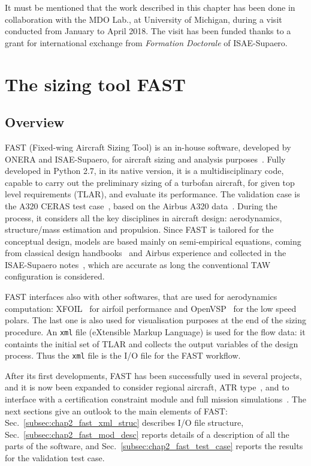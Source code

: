 It must be mentioned that the work described in this chapter has been done in collaboration with the MDO Lab., at University of Michigan, during a visit conducted from January to April 2018.
The visit has been funded thanks to a grant for international exchange from \textit{Formation Doctorale} of ISAE-Supaero. 

\section{The sizing tool FAST}
\label{sec:chap2_fast_base_description}

\subsection{Overview}
\label{subsec:chap2_fast_overview}
FAST (Fixed-wing Aircraft Sizing Tool) is an in-house software, developed by ONERA and ISAE-Supaero, for aircraft sizing and analysis purposes~\cite{bib:fast_main}. 
Fully developed in Python 2.7, in its native version, it is a multidisciplinary code, capable to carry out the preliminary sizing of a turbofan aircraft, for given top level requirements (TLAR), and evaluate its performance.
The validation case is the A320 CERAS test case~\cite{bib:schmollgruber}, based on the Airbus A320 data~\cite{bib:a320_specifications}. 
During the process, it considers all the key disciplines in aircraft design: aerodynamics, structure/mass estimation and propulsion. 
Since FAST is tailored for the conceptual design, models are based mainly on semi-empirical equations, coming from classical design handbooks~\cite{bib:roskam_partI, bib:raymer} and Airbus experience and collected in the ISAE-Supaero notes~\cite{bib:airbus_notes}, which are accurate as long the conventional TAW configuration is considered. 

FAST interfaces also with other softwares, that are used for aerodynamics computation: XFOIL~\cite{bib:xfoil} for airfoil performance and OpenVSP~\cite{bib:openvsp} for the low speed polars. 
The last one is also used for visualisation purposes at the end of the sizing procedure. 
An \texttt{xml} file (eXtensible Markup Language) is used for the flow data: it containts the initial set of TLAR and collects the output variables of the design process. 
Thus the \texttt{xml} file is the I/O file for the FAST workflow.

After its first developments, FAST has been successfully used in several projects, and it is now been expanded to consider regional aircraft, ATR type~\cite{bib:bohari}, and to interface with a certification constraint module and full mission simulations~\cite{bib:schmollgruber, bib:schmollgruber_phd}. 
The next sections give an outlook to the main elements of FAST: Sec.~\ref{subsec:chap2_fast_xml_struc} describes I/O file structure, Sec.~\ref{subsec:chap2_fast_mod_desc} reports details of  a description of all the parts of the software, and Sec.~\ref{subsec:chap2_fast_test_case} reports the results for the validation test case.  

